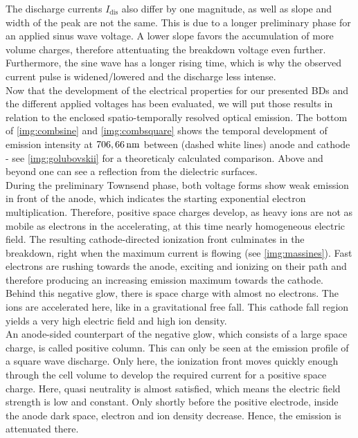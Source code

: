 \documentclass[a4paper,10pt,twoside]{article}
\newcommand{\ix}[1]{_\text{#1}}
\begin{document}
		The discharge currents $I\ix{dis}$ also differ by one magnitude, as well as slope and width of the peak are not the same. This is due to a longer preliminary phase for an applied sinus wave voltage. A lower slope favors the accumulation of more volume charges, therefore attentuating the breakdown voltage even further. Furthermore, the sine wave has a longer rising time, which is why the observed current pulse is widened/lowered and the discharge less intense.\\					
		Now that the development of the electrical properties for our presented BDs and the different applied voltages has been evaluated, we will put those results in relation to the enclosed spatio-temporally resolved optical emission. The bottom of \autoref{img:combsine} and \autoref{img:combsquare} shows the temporal development of emission intensity at $\unit[706,66]{nm}$ between (dashed white lines) anode and cathode - see \autoref{img:golubovskii} for a theoreticaly calculated comparison. Above and beyond one can see a reflection from the dielectric surfaces.\\
		During the preliminary Townsend phase, both voltage forms show weak emission in front of the anode, which indicates the starting exponential electron multiplication. Therefore, positive space charges develop, as heavy ions are not as mobile as electrons in the accelerating, at this time nearly homogeneous electric field. The resulting cathode-directed ionization front culminates in the breakdown, right when the maximum current is flowing (see \autoref{img:massines}). Fast electrons are rushing towards the anode, exciting and ionizing on their path and therefore producing an increasing emission maximum towards the cathode. Behind this negative glow, there is space charge with almost no electrons. The ions are accelerated here, like in a gravitational free fall. This cathode fall region yields a very high electric field and high ion density.\\
		An anode-sided counterpart of the negative glow, which consists of a large space charge, is called positive column. This can only be seen at the emission profile of a square wave discharge. Only here, the ionization front moves quickly enough through the cell volume to develop the required current for a positive space charge. Here, quasi neutrality is almost satisfied, which means the electric field strength is low and constant. Only shortly before the positive electrode, inside the anode dark space, electron and ion density decrease. Hence, the emission is attenuated there.\\
\end{document}

